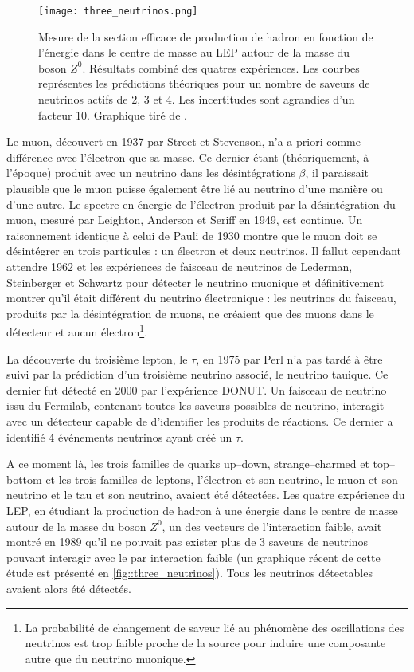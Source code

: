 			\begin{figure}
				\texttt{[image: three\_neutrinos.png]}
				\caption[Spectre de désintégration $\beta$.]{\label{fig::three_neutrinos}Mesure de la section efficace de production de hadron en fonction de l'énergie dans le centre de masse au LEP autour de la masse du boson $Z^0$. Résultats combiné des quatres expériences. Les courbes représentes les prédictions théoriques pour un nombre de saveurs de neutrinos actifs de 2, 3 et 4. Les incertitudes sont agrandies d'un facteur 10. Graphique tiré de \cite{Mele2015}.}
			\end{figure}
			Le muon, découvert en 1937 par Street et Stevenson\cite{Street1937}, n'a a priori comme différence avec l'électron que sa masse. Ce dernier étant (théoriquement, à l'époque) produit avec un neutrino dans les désintégrations $\beta$, il paraissait plausible que le muon puisse également être lié au neutrino d'une manière ou d'une autre.  Le spectre en énergie de l'électron produit par la désintégration du muon, mesuré par Leighton, Anderson et Seriff en 1949\cite{Leighton1949}, est continue. Un raisonnement identique à celui de Pauli de 1930 montre que le muon doit se désintégrer en trois particules : un électron et deux neutrinos. Il fallut cependant attendre 1962 et les expériences de faisceau de neutrinos de Lederman, Steinberger et Schwartz\cite{Danby1962} pour détecter le neutrino muonique et définitivement montrer qu'il était différent du neutrino électronique : les neutrinos du faisceau, produits par la désintégration de muons, ne créaient que des muons dans le détecteur et aucun électron\footnote{La probabilité  de changement de saveur lié au phénomène des oscillations des neutrinos est trop faible proche de la source pour induire une composante autre que du neutrino muonique.}.
			
			La découverte du troisième lepton, le $\tau$, en 1975 par Perl\cite{Perl1975} n'a pas tardé à être suivi par la prédiction d'un troisième neutrino associé, le neutrino tauique. Ce dernier fut détecté en 2000 par l'expérience DONUT\cite{Collaboration2000}. Un faisceau de neutrino issu du Fermilab, contenant toutes les saveurs possibles de neutrino, interagit avec un détecteur capable de d'identifier les produits de réactions. Ce dernier a identifié 4 événements neutrinos ayant créé un $\tau$.
			
			A ce moment là, les trois familles de quarks up--down, strange--charmed et top--bottom et les trois familles de leptons, l'électron et son neutrino, le muon et son neutrino et le tau et son neutrino, avaient été détectées. Les quatre expérience du LEP, en étudiant la production de hadron à une énergie dans le centre de masse autour de la masse du boson $Z^0$, un des vecteurs de l'interaction faible, avait montré en 1989 qu'il ne pouvait pas exister plus de 3 saveurs de neutrinos pouvant interagir avec le par interaction faible\cite{DeCamp1989} (un graphique récent de cette étude est présenté en \autoref{fig::three_neutrinos}). Tous les neutrinos détectables avaient alors été détectés.
		    
